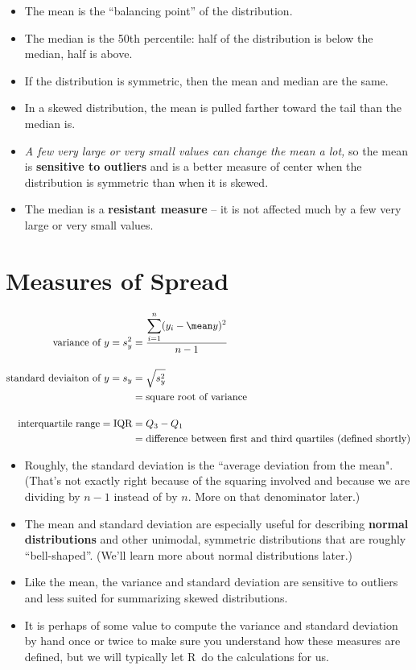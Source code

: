 \documentclass[twoside]{book}\usepackage[]{graphicx}\usepackage[]{xcolor}
\def\R{{\sf R}}
\def\term#1{\textbf{#1}}
\begin{document}
\begin{itemize}
\item
The mean is the ``balancing point'' of the distribution.
\item
The median is the 50th percentile: half of the distribution is below the median,
half is above.
\item
If the distribution is symmetric, then the mean and median are the same.
\item
In a skewed distribution, the mean is pulled farther toward the tail than the median is.
\item
\emph{A few very large or very small values can change the mean a lot,}
so the mean is \term{sensitive to outliers} and is a better measure of center
when the distribution is symmetric than when it is skewed.
\item
The median is a \term{resistant measure} -- it is not affected much
by a few very large or very small values.
\end{itemize}



\section{Measures of Spread}

\begin{align*}
\mbox{variance of $y$} 
= s^2_y 
&= 
\frac{\displaystyle \sum_{i=1}^{n} (y_i - \mean y)^2 }{n-1}
\\[4mm]
\mbox{standard deviaiton of $y$} = s_y 
&= \sqrt{s^2_y} 
\\
&= \mbox{square root of variance}
\\[4mm]
\mbox{interquartile range} = \mbox{IQR}
&= Q_3 - Q_1 
\\
& = \mbox{difference between first and third quartiles (defined shortly)}
\end{align*}

\begin{itemize}
\item
Roughly, the standard deviation is the ``average deviation from the mean".  (That's not
exactly right because of the squaring involved and because we are dividing
by $n-1$ instead of by $n$.  More on that denominator later.)  
\item
The mean and standard deviation are especially useful for describing 
\term{normal distributions} and other unimodal, symmetric distributions that
are roughly ``bell-shaped''.  (We'll learn more about normal distributions later.)
\item
Like the mean, the variance and standard deviation are 
sensitive to outliers and less suited for summarizing skewed distributions.
\item
It is perhaps of some value to compute the variance and standard deviation by hand
once or twice to make sure you understand how these measures are defined, but we will
typically let \R\ do the calculations for us.
\end{itemize}
\end{document}
